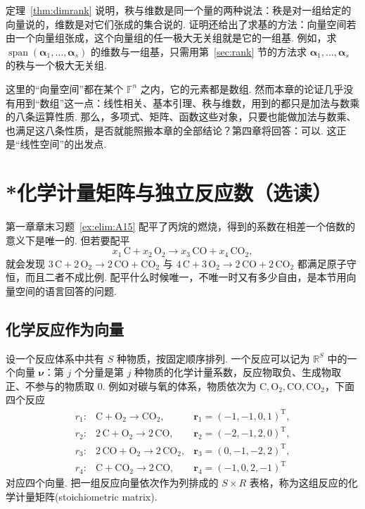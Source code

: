 \documentclass[lang=cn,10.5pt,scheme=chinese,toc=twocol,section,chinesefont=nofont,
twoside,citestyle=gb7714-2015,bibstyle=gb7714-2015]{elegantbook}
\DeclareRobustCommand{\textbf}[1]{{\lnsemiboldlatin\lnsemiboldcjk #1}}
\newcommand{\vv}[1]{\boldsymbol{#1}}
\newcommand{\trans}{\mathrm{T}}             %
\numberwithin{equation}{section}   %
\newcommand{\spn}{\operatorname{span}}      %
\begin{document}
定理~\ref{thm:dimrank} 说明，秩与维数是同一个量的两种说法：秩是对一组\textbf{给定的向量}说的，维数是对它们张成的\textbf{集合}说的. 证明还给出了求基的方法：向量空间若由一个向量组张成，这个向量组的任一极大无关组就是它的一组基. 例如，求 $\spn(\vv\alpha_1,\ldots,\vv\alpha_s)$ 的维数与一组基，只需用第~\ref{sec:rank} 节的方法求 $\vv\alpha_1,\ldots,\vv\alpha_s$ 的秩与一个极大无关组.

\begin{motivebox}
  这里的“向量空间”都在某个 $\mathbb{F}^n$ 之内，它的元素都是数组. 然而本章的论证几乎没有用到“数组”这一点：线性相关、基本引理、秩与维数，用到的都只是加法与数乘的八条运算性质. 那么，多项式、矩阵、函数这些对象，只要也能做加法与数乘、也满足这八条性质，是否就能照搬本章的全部结论？第四章将回答：可以. 这正是“线性空间”的出发点.
\end{motivebox}

\section{*化学计量矩阵与独立反应数（选读）}\label{sec:stoich}

第一章章末习题~\ref{ex:elim:A15} 配平了丙烷的燃烧，得到的系数在相差一个倍数的意义下是唯一的. 但若要配平
\[
  x_1\,\mathrm{C}+x_2\,\mathrm{O_2}\to x_3\,\mathrm{CO}+x_4\,\mathrm{CO_2},
\]
就会发现 $3\,\mathrm{C}+2\,\mathrm{O_2}\to2\,\mathrm{CO}+\mathrm{CO_2}$ 与 $4\,\mathrm{C}+3\,\mathrm{O_2}\to2\,\mathrm{CO}+2\,\mathrm{CO_2}$ 都满足原子守恒，而且二者不成比例. 配平什么时候唯一，不唯一时又有多少自由，是本节用向量空间的语言回答的问题.

\subsection{化学反应作为向量}

设一个反应体系中共有 $S$ 种物质，按固定顺序排列. 一个反应可以记为 $\mathbb{R}^S$ 中的一个向量 $\vv\nu$：第 $j$ 个分量是第 $j$ 种物质的\textbf{化学计量系数}，反应物取负、生成物取正、不参与的物质取 $0$. 例如对碳与氧的体系，物质依次为 $\mathrm{C},\mathrm{O_2},\mathrm{CO},\mathrm{CO_2}$，下面四个反应
\[
  \begin{array}{lll}
    r_1: & \mathrm{C}+\mathrm{O_2}\to\mathrm{CO_2},        & \vv r_1=(-1,-1,0,1)^\trans, \\
    r_2: & 2\,\mathrm{C}+\mathrm{O_2}\to2\,\mathrm{CO},    & \vv r_2=(-2,-1,2,0)^\trans, \\
    r_3: & 2\,\mathrm{CO}+\mathrm{O_2}\to2\,\mathrm{CO_2}, & \vv r_3=(0,-1,-2,2)^\trans, \\
    r_4: & \mathrm{C}+\mathrm{CO_2}\to2\,\mathrm{CO},      & \vv r_4=(-1,0,2,-1)^\trans
  \end{array}
\]
对应四个向量. 把一组反应向量依次作为列排成的 $S\times R$ 表格，称为这组反应的\textbf{化学计量矩阵}(stoichiometric matrix).
\end{document}
